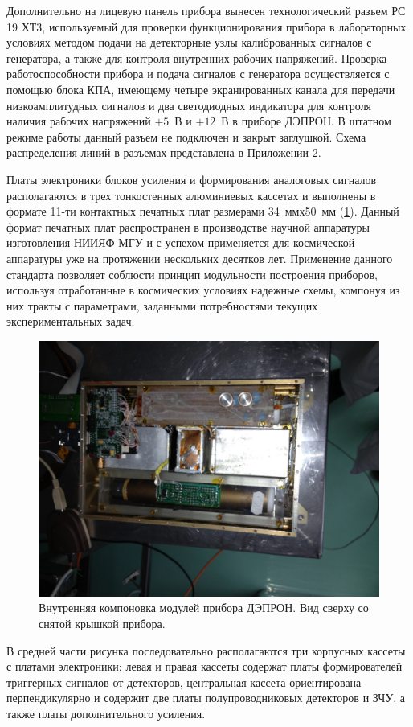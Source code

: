 Дополнительно на лицевую панель прибора вынесен технологический разъем РС 19 ХТ3, используемый для проверки функционирования прибора в лабораторных условиях методом подачи на детекторные узлы калиброванных сигналов с генератора, а также для контроля внутренних рабочих напряжений. Проверка работоспособности прибора и подача сигналов с генератора осуществляется с помощью блока КПА, имеющему четыре экранированных канала для передачи низкоамплитудных сигналов и два светодиодных индикатора для контроля наличия рабочих напряжений  $+5$~В и $  +12$~В в приборе ДЭПРОН.  В штатном режиме работы данный разъем не подключен и закрыт заглушкой. Схема распределения линий в разъемах представлена в Приложении 2.

Платы электроники блоков усиления и формирования аналоговых сигналов располагаются в трех тонкостенных алюминиевых кассетах и выполнены в формате 11-ти контактных печатных плат размерами 34~ммх50~мм (\ref{fig:Depron_inside}). Данный формат печатных плат распространен в производстве научной аппаратуры изготовления НИИЯФ МГУ и с успехом применяется для космической аппаратуры уже на протяжении нескольких десятков лет. Применение данного стандарта позволяет соблюсти принцип модульности построения приборов, используя отработанные в космических условиях надежные схемы, компонуя из них тракты с параметрами, заданными потребностями текущих экспериментальных задач. 

\begin{figure}
\centering
\includegraphics[width=0.7\linewidth]{images/Depron_inside}
\caption{Внутренняя компоновка модулей прибора ДЭПРОН. Вид сверху со снятой крышкой прибора.}
\label{fig:Depron_inside}
\end{figure}


В средней части рисунка последовательно располагаются три корпусных кассеты с платами электроники: левая и правая кассеты содержат платы формирователей триггерных сигналов от детекторов, центральная кассета ориентирована перпендикулярно и содержит две платы полупроводниковых детекторов и ЗЧУ, а также платы дополнительного усиления.

